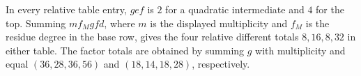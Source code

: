 



In every relative table entry, $gef$ is $2$ for a quadratic intermediate and
$4$ for the top.  Summing $m f_M g f d$, where $m$ is the displayed
multiplicity and $f_M$ is the residue degree in the base row, gives the four
relative different totals $8,16,8,32$ in either table.  The
factor totals are obtained by summing $g$ with multiplicity and equal
$(36,28,36,56)$ and $(18,14,18,28)$, respectively.
